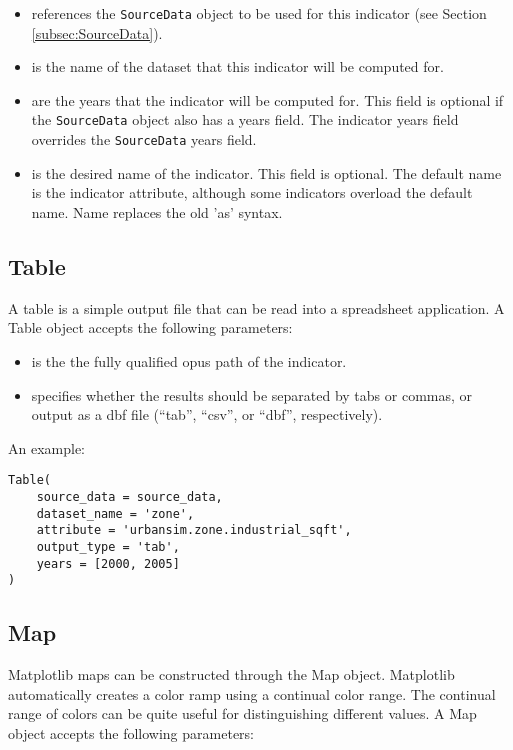 \begin{itemize}
\tight
\item {} references the \verb|SourceData| object to be used for
this indicator (see Section~ \ref{subsec:SourceData}). 

\item {} is the name of the dataset that this indicator will be 
computed for.

\item {} are the years that the indicator will be computed for.
This field is optional if the \verb|SourceData| object also 
has a years field. The indicator years field overrides
the \verb|SourceData| years field.

\item {} is the desired name of the indicator. This field is optional. 
The default name is the indicator attribute, although 
some indicators overload the default name. Name replaces 
the old 'as' syntax.

\end{itemize}

\subsection{Table}
A table is a simple output file that can be read into a spreadsheet application. 
A Table object accepts the following parameters:

\begin{itemize}
\tight
\item {} is the the fully qualified opus path of the indicator. 
\item {} specifies whether the results should be separated 
by tabs or commas, or output as a dbf file (``tab'', ``csv'', or ``dbf'', respectively).
\end{itemize}

An example:
\begin{verbatim}
Table(
    source_data = source_data,
    dataset_name = 'zone',
    attribute = 'urbansim.zone.industrial_sqft',
    output_type = 'tab',
    years = [2000, 2005] 
) 
\end{verbatim}

\subsection{Map}

Matplotlib maps can be constructed through the Map object. 
Matplotlib automatically creates a color
ramp using a continual color range.  The continual range of colors can be
quite useful for distinguishing different values. 
A Map object accepts the following parameters:

